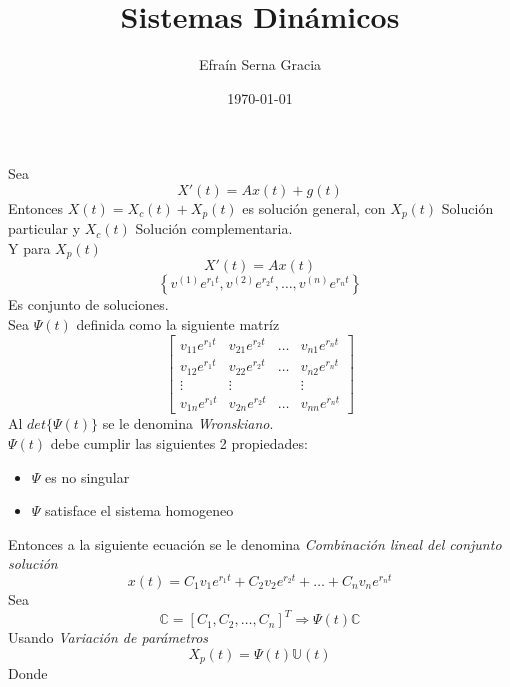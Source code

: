 \documentclass[12pt,spanish,lettersize,twocolumn]{article}
\title{\color{Maroon}Sistemas Din\'amicos}
\author{Efra\'in Serna Gracia}
\date{\color{gray}\today}
\begin{document}
\maketitle
Sea
\begin{equation}\label{Axt+gt}
X'(t)=Ax(t)+g(t)
\end{equation}
Entonces $X(t)=X_c(t)+X_p(t)$ es soluci\'on general, con $X_p(t)$ Soluci\'on particular y $X_c(t)$ Soluci\'on complementaria.\\
Y para $X_p(t)$
\begin{equation}
X'(t)=Ax(t)
\end{equation}
\begin{equation}
\left\{v^{(1)}e^{r_1t},v^{(2)}e^{r_2t},\dots,v^{(n)}e^{r_nt}\right\}
\end{equation}
Es conjunto de soluciones.\\
Sea $\Psi(t)$ definida como la siguiente matr\'iz
\begin{equation}
\left[
\begin{array}{cccc}
v_{11}e^{r_1t}&v_{21}e^{r_2t}&\dots&v_{n1}e^{r_nt}\\
v_{12}e^{r_1t}&v_{22}e^{r_2t}&\dots&v_{n2}e^{r_nt}\\
\vdots&\vdots & &\vdots \\
v_{1n}e^{r_1t}&v_{2n}e^{r_2t}&\dots&v_{nn}e^{r_nt}
\end{array}
\right]
\end{equation}
Al $det\{\Psi(t)\}$ se le denomina \emph{Wronskiano}.\\
$\Psi(t)$ debe cumplir las siguientes 2 propiedades:
\begin{itemize}
\item $\Psi$ es no singular\\
\item $\Psi$ satisface el sistema homogeneo
\end{itemize}
Entonces a la siguiente ecuaci\'on se le denomina \emph{Combinaci\'on lineal del conjunto soluci\'on}\\
\begin{equation}
x(t)=C_1v_1e^{r_1t}+C_2v_2e^{r_2t}+\dots+C_nv_ne^{r_nt}
\end{equation}
Sea
\begin{equation}
\mathbb{C}=[C_1, C_2, \dots, C_n]^T \Rightarrow \Psi(t)\mathbb{C}
\end{equation}
Usando \emph{Variaci\'on de par\'ametros}
\begin{equation}
X_p(t)=\Psi(t)\mathbb{U}(t)
\end{equation}
Donde
\end{document}

